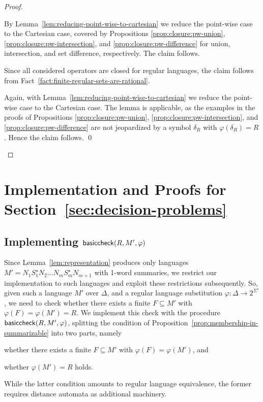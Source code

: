 \documentclass[envcountsame]{llncs}
\newcommand{\basiccheck}{\ensuremath{{\sf basiccheck}}\xspace}
\begin{document}
\begin{proof}
  \begin{inparaenum}[\bfseries(1)]
  \item By Lemma~\ref{lem:reducing-point-wise-to-cartesian} we reduce
    the point-wise case to the Cartesian case, covered by Propositions
    \ref{prop:closure:pw-union}, \ref{prop:closure:pw-intersection},
    and \ref{prop:closure:pw-difference} for union, intersection, and
    set difference, respectively.
The claim follows.
  \item Since all considered operators are closed for regular
    languages, the claim follows from
    Fact~\ref{fact:finite-regular-sets-are-rational}.
  \item Again, with Lemma~\ref{lem:reducing-point-wise-to-cartesian}
    we reduce the point-wise case to the Cartesian case.
The lemma is applicable, as the examples in the proofs of
    Propositions \ref{prop:closure:pw-union},
    \ref{prop:closure:pw-intersection}, and
    \ref{prop:closure:pw-difference} are not jeopardized by a symbol
    $\delta_R$ with $\varphi(\delta_R)=R$.
Hence the claim follows. \qed
  \end{inparaenum}
\end{proof}


%
 \section{Implementation and Proofs for Section~\ref{sec:decision-problems}}
\label{sec:decision-problems-detail}


\subsection{Implementing $\basiccheck(R,M',\varphi)$}
\label{sec:impl-prop}
Since Lemma~\ref{lem:representation} produces only languages
$M'=N_1S_1^\star N_2\dots N_mS_m^\star N_{m+1}$ with 1-word summaries,
we restrict our implementation to such languages and exploit these
restrictions subsequently.
So, given such a language $M'$ over $\Delta$, and a regular language
substitution $\varphi : \Delta \rightarrow 2^{\Sigma^\star}$, we need to
check whether there exists a finite $F\subseteq M'$ with
$\varphi(F)=\varphi(M')=R$.
We implement this check with the procedure
$\basiccheck(R,M',\varphi)$, splitting the condition of
Proposition~\ref{prop:membership-in-summarizable} into two parts,
namely
\begin{inparaenum}[\bfseries(1)]
\item whether there exists a finite $F\subseteq M'$ with
  $\varphi(F)=\varphi(M')$, and
\item whether $\varphi(M')=R$ holds.
\end{inparaenum}
While the latter condition amounts to regular language equivalence,
the former requires distance automata as additional machinery.
\end{document}
